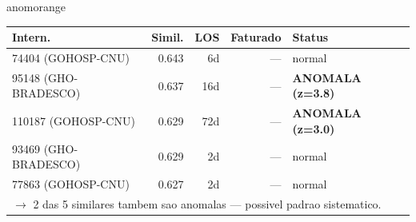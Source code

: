 \documentclass[a4paper,10pt]{article}
\begin{document}
\begin{anomalycard}[Internacao 164668 | GHO-PETROBRAS | ALTO (z=4.20)]{anomorange}
\begin{tabular}{l r r r l}\toprule\textbf{Intern.} & \textbf{Simil.} & \textbf{LOS} & \textbf{Faturado} & \textbf{Status} \\\midrule
74404 (GOHOSP-CNU) & 0.643 & 6d & --- & \textcolor{jcubeblue}{normal} \\
95148 (GHO-BRADESCO) & 0.637 & 16d & --- & \textcolor{anomred}{\textbf{ANOMALA (z=3.8)}} \\
110187 (GOHOSP-CNU) & 0.629 & 72d & --- & \textcolor{anomred}{\textbf{ANOMALA (z=3.0)}} \\
93469 (GHO-BRADESCO) & 0.629 & 2d & --- & \textcolor{jcubeblue}{normal} \\
77863 (GOHOSP-CNU) & 0.627 & 2d & --- & \textcolor{jcubeblue}{normal} \\
\multicolumn{5}{l}{\textcolor{anomred}{\small $\rightarrow$ 2 das 5 similares tambem sao anomalas --- possivel padrao sistematico.}} \\
\bottomrule\end{tabular}



\end{anomalycard}

\newpage
\end{document}
